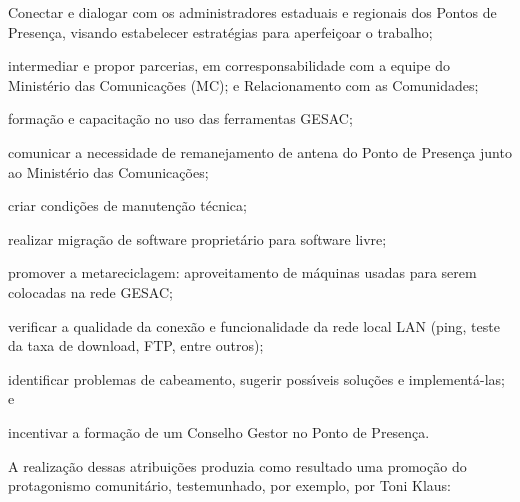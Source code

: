 \documentclass[
12pt,		%
openright,	%
twoside,  %
a4paper,			%
chapter=TITLE,		%
english,			%
french,				%
spanish,			%
brazil				%
]{USPSC-classe/USPSC}
\begin{document}
\begin{alineas}
\item Conectar e dialogar com os administradores estaduais e regionais dos Pontos de Presen\c{c}a, visando estabelecer estrat\'egias para aperfei\c{c}oar o trabalho;
\item intermediar e propor parcerias, em corresponsabilidade com a equipe do Minist\'erio das Comunica\c{c}\~oes (MC); e Relacionamento com as Comunidades;
\item forma\c{c}\~ao e capacita\c{c}\~ao no uso das ferramentas GESAC;
\item comunicar a  necessidade de remanejamento de antena  do Ponto de Presen\c{c}a junto ao Minist\'erio das Comunica\c{c}\~oes;
\item criar condi\c{c}\~oes de manuten\c{c}\~ao t\'ecnica;
\item realizar migra\c{c}\~ao de software propriet\'ario para software livre;
\item promover a metareciclagem: aproveitamento de m\'aquinas usadas para serem colocadas na rede GESAC;
\item verificar a qualidade da conex\~ao e  funcionalidade da rede local LAN (ping, teste da taxa de download, FTP, entre outros);
\item identificar problemas de cabeamento, sugerir poss\'{\i}veis solu\c{c}\~oes e implement\'a-las; e
\item incentivar a forma\c{c}\~ao de um Conselho Gestor no Ponto de Presen\c{c}a.
\end{alineas}

A realiza\c{c}\~ao dessas atribui\c{c}\~oes produzia como resultado uma promo\c{c}\~ao do protagonismo comunit\'ario, testemunhado, por exemplo, por Toni Klaus:










\noindent\begin{center}\mbox{\centering{}}\end{center}
\end{document}
